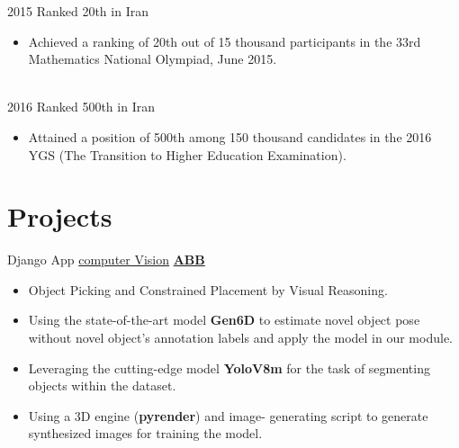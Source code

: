 \documentclass[letterpaper]{DS_class_file} %
\begin{document}
\begin{twenty} %
	\twentyitem
	{2015}
	{}
	{\hspace{0.3cm}Ranked 20th in Iran}
	{}
	{}
	{
		{\begin{itemize}
				\item Achieved a ranking of 20th out of 15 thousand participants in the 33rd Mathematics National Olympiad, June 2015.
		\end{itemize}}
	}
	\\
	\twentyitem
	{2016}
	{}
	{\hspace{0.3cm}Ranked 500th in Iran}
	{}
	{}
	{\begin{itemize}
			\item Attained a position of 500th among 150 thousand candidates in the 2016 YGS (The Transition to Higher Education Examination).    
   
	\end{itemize}}

\end{twenty}



\newpage
\makeseconda
\section{Projects}

\begin{twenty} %
    
	\twentyitem
	{Django}
	{App}
	{\hspace{0.3cm}\href{}{computer Vision}}
	{\href{https://new.abb.com/se}{\textbf{ABB}}}
	{}
	{
		{\begin{itemize}
				\item Object Picking and Constrained Placement by Visual Reasoning.
                \item Using the state-of-the-art model \textbf{Gen6D} to estimate novel object pose without novel object’s annotation labels and apply the model in our module.
                \item Leveraging the cutting-edge model \textbf{YoloV8m} for the task of segmenting objects within the dataset.
    \item Using a 3D engine (\textbf{pyrender}) and image-
generating script to generate synthesized images for training the model.
		\end{itemize}}
	}
	
\end{twenty}
\end{document}
